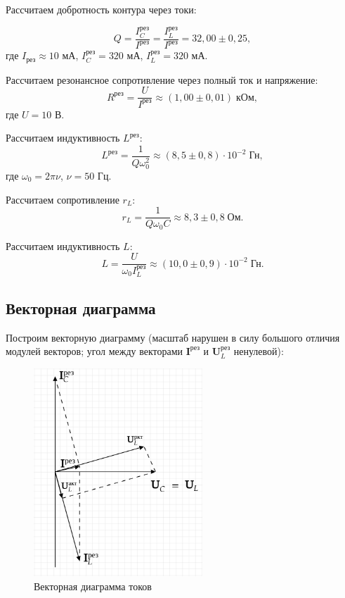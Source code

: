 \documentclass[a4paper]{article}
\theoremstyle{definition}
\theoremstyle{remark}
\begin{document}
\noindent Рассчитаем добротность контура через токи:

$$Q = \frac{I_C^{\text{рез}}}{I^{\text{рез}}} = \frac{I_L^{\text{рез}}}{I^{\text{рез}}} = 32,00 \pm 0,25,$$ где $I_{\text{рез}} \approx 10$ мА, $I_C^{\text{рез}} = 320$ мА, $I_L^{\text{рез}} = 320$ мА. \medskip

\noindent Рассчитаем резонансное сопротивление через полный ток и напряжение: $$R^{\text{рез}} = \frac{U}{I^{\text{рез}}} \approx (1,00 \pm 0,01) \;\text{кОм},$$ где $U = 10$ В. \medskip


\noindent Рассчитаем индуктивность $L^{\text{рез}}$: $$L^{\text{рез}} = \frac{1}{Q\omega_0^2} \approx (8,5 \pm 0,8)\cdot 10^{-2} \;\text{Гн},$$ где $\omega_0 = 2\pi\nu$, $\nu = 50$ Гц. \medskip

\noindent Рассчитаем сопротивление $r_L$: $$r_L = \frac{1}{Q\omega_0 C} \approx 8,3 \pm 0,8 \;\text{Ом}.$$ \medskip

\noindent Рассчитаем индуктивность $L$: $$L = \frac{U}{\omega_0 I^{\text{рез}}_L} \approx (10,0 \pm 0,9) \cdot 10^{-2} \;\text{Гн}.$$

\subsection{Векторная диаграмма}

Построим векторную диаграмму (масштаб нарушен в силу большого отличия модулей векторов; угол между векторами $\mathbf{I}^{\text{рез}}$ и $\mathbf{U}_L^{\text{рез}}$ ненулевой):

\begin{figure}[h!]
    \centering
    \includegraphics[width = 180pt]{image/picture2.png}
    \caption{Векторная диаграмма токов}
\end{figure}
\end{document}
